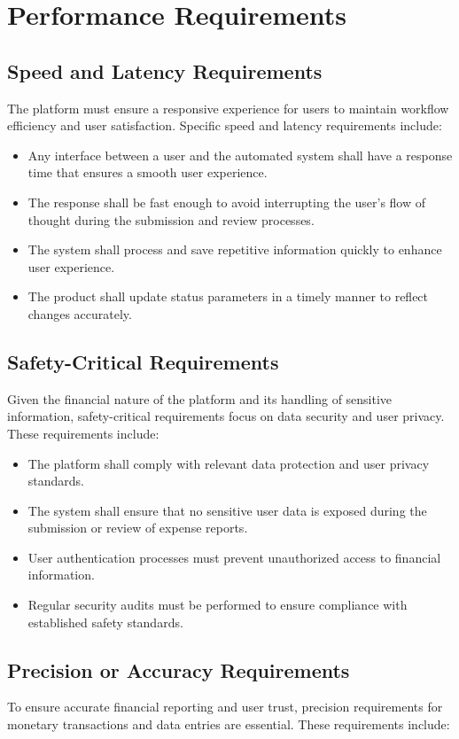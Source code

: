\documentclass[12pt]{article}
\begin{document}
\section{Performance Requirements}

\subsection{Speed and Latency Requirements}
The platform must ensure a responsive experience for users to maintain workflow efficiency and user satisfaction. Specific speed and latency requirements include:

\begin{itemize}
    \item Any interface between a user and the automated system shall have a response time that ensures a smooth user experience.
    \item The response shall be fast enough to avoid interrupting the user’s flow of thought during the submission and review processes.
    \item The system shall process and save repetitive information quickly to enhance user experience.
    \item The product shall update status parameters in a timely manner to reflect changes accurately.
\end{itemize}

\subsection{Safety-Critical Requirements}
Given the financial nature of the platform and its handling of sensitive information, safety-critical requirements focus on data security and user privacy. These requirements include:

\begin{itemize}
    \item The platform shall comply with relevant data protection and user privacy standards.
    \item The system shall ensure that no sensitive user data is exposed during the submission or review of expense reports.
    \item User authentication processes must prevent unauthorized access to financial information.
    \item Regular security audits must be performed to ensure compliance with established safety standards.
\end{itemize}

\subsection{Precision or Accuracy Requirements}
To ensure accurate financial reporting and user trust, precision requirements for monetary transactions and data entries are essential. These requirements include:
\end{document}
